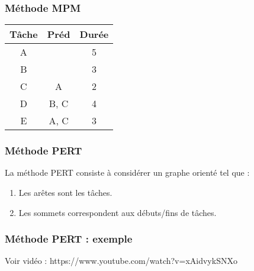 \documentclass[draft]{beamer}
\begin{document}
\begin{frame}[fragile]
    \frametitle{Méthode MPM}
    \begin{table}[]
        \begin{tabular}{|c|c|c|}
            \hline
            Tâche & Préd & Durée \\ \hline
            A     &      & 5     \\ \hline
            B     &      & 3     \\ \hline
            C     & A    & 2     \\ \hline
            D     & B, C & 4     \\ \hline
            E     & A, C & 3     \\ \hline
        \end{tabular}
    \end{table}
    \pause

    \begin{figure}
    \end{figure}

    \color{red}{Dates au plus tôt pour démarrer chaque tâche}
\end{frame}

\begin{frame}[fragile]
    \frametitle{Méthode PERT}
    La méthode PERT consiste à considérer un graphe orienté tel que :
    \begin{enumerate}
        \item Les arêtes sont les tâches.
        \item Les sommets correspondent aux débuts/fins de tâches.
    \end{enumerate}
\end{frame}

\begin{frame}
    \frametitle{Méthode PERT : exemple}
    Voir vidéo : https://www.youtube.com/watch?v=xAidvykSNXo
\end{frame}
\end{document}
